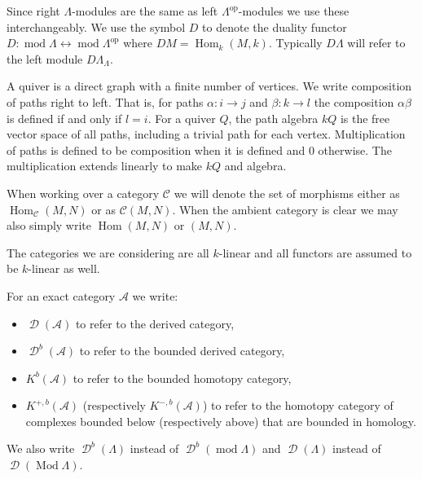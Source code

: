 \documentclass[11pt, a4paper, english]{article}
\theoremstyle{definition}
\DeclareMathOperator{\Hom}{Hom}
\DeclareMathOperator{\op}{op}
\DeclareMathOperator{\Mod}{Mod}
\def\mod{\operatorname{mod}}
\DeclareMathOperator{\D}{\mathscr{D}}
\begin{document}

Since right $\Lambda$-modules are the same as left $\Lambda^{\op}$-modules we use these interchangeably. We use the symbol $D$ to denote the duality functor $D\colon \mod \Lambda \leftrightarrow \mod\Lambda^{\operatorname{op}}$ where $DM = \Hom_k(M, k)$. Typically $D\Lambda$ will refer to the left module $D\Lambda_\Lambda$.


A quiver is a direct graph with a finite number of vertices. We write composition of paths right to left. That is, for paths $\alpha\colon i \to j$ and $\beta\colon k\to l$ the composition $\alpha\beta$ is defined if and only if $l=i$. For a quiver $Q$, the path algebra $kQ$ is the free vector space of all paths, including a trivial path for each vertex. Multiplication of paths is defined to be composition when it is defined and 0 otherwise. The multiplication extends linearly to make $kQ$ and algebra.



When working over a category $\mathcal C$ we will denote the set of morphisms either as $\Hom_{\mathcal C}(M, N)$ or as $\mathcal C(M,N)$. When the ambient category is clear we may also simply write $\Hom(M, N)$ or $(M, N)$.

The categories we are considering are all $k$-linear and all functors are assumed to be $k$-linear as well.


For an exact category $\mathcal A$ we write:
\begin{itemize}
	\item $\D(\mathcal A)$ to refer to the derived category, 
	\item $\D^b(\mathcal A)$ to refer to the bounded derived category, 
	\item $K^b(\mathcal A)$ to refer to the bounded homotopy category, 
	\item $K^{+,b}(\mathcal A)$ (respectively $K^{-,b}(\mathcal A)$) to refer to the homotopy category of complexes bounded below (respectively above) that are bounded in homology.
\end{itemize}
We also write $\D^b(\Lambda)$ instead of $\D^b(\mod\Lambda)$ and $\D(\Lambda)$ instead of $\D(\Mod\Lambda)$. 
\end{document}
